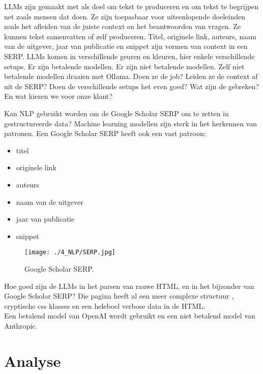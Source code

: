  
LLMs zijn gemaakt met als doel om tekst te produceren en om tekst te begrijpen net zoals mensen dat doen. Ze zijn toepasbaar voor uiteenlopende doeleinden zoals het afleiden van de juiste context en het beantwoorden van vragen. Ze kunnen tekst samenvatten of zelf produceren.
Titel, originele link, auteurs, naam van de uitgever, jaar van publicatie en snippet zijn vormen van context in een SERP.
LLMs komen in verschillende geuren en kleuren, hier enkele verschillende setups.
Er zijn betalende modellen.
Er zijn niet betalende modellen.
Zelf niet betalende modellen draaien met Ollama.
Doen ze de job? Leiden ze de context af uit de SERP? Doen de verschillende setups het even goed? Wat zijn de gebreken? En wat kiezen we voor onze klant?

Kan NLP gebruikt worden om de Google Scholar SERP om te zetten in gestructureerde data? Machine learning modellen zijn sterk in het herkennen van patronen. Een Google Scholar SERP heeft ook een vast patroon:
\begin{itemize}
    \item titel
    \item originele link
    \item auteurs
    \item naam van de uitgever
    \item jaar van publicatie
    \item snippet
\end{itemize}
\begin{figure}
    \centering
    \texttt{[image: ./4\_NLP/SERP.jpg]}
    \caption[Google Scholar SERP.]{\label{fig:Google ScholarSERP}Google Scholar SERP.}
\end{figure}
Hoe goed zijn de LLMs in het parsen van rauwe HTML, en in het bijzonder van Google Scholar SERP? Die pagina heeft al een meer complexe structuur , cryptische css klasses en een heleboel verbose data in de HTML.\\
Een betalend model van OpenAI wordt gebruikt en een niet betalend model van Anthropic.
\section{Analyse}
\lipsum[1-2]

